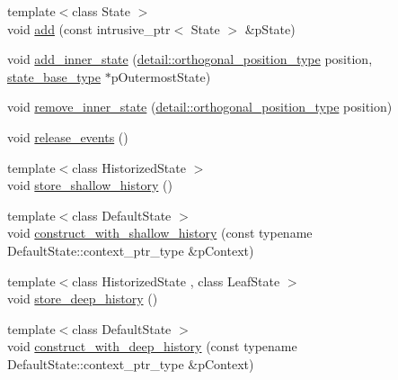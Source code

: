 \begin{DoxyCompactItemize}
\item 
{\footnotesize template$<$class State $>$ }\\void \mbox{\hyperlink{classboost_1_1statechart_1_1state__machine_ae1b47e23bb0486e60f2cc9d80fb76b99}{add}} (const intrusive\+\_\+ptr$<$ State $>$ \&p\+State)
\item 
void \mbox{\hyperlink{classboost_1_1statechart_1_1state__machine_ae3cebe8b5870bda788a95be852e5d3be}{add\+\_\+inner\+\_\+state}} (\mbox{\hyperlink{namespaceboost_1_1statechart_1_1detail_a3bedea0b807a16fa222733417183d2c9}{detail\+::orthogonal\+\_\+position\+\_\+type}} position, \mbox{\hyperlink{classboost_1_1statechart_1_1state__machine_a69cc258c29fcabec25c5dc8bedb7d530}{state\+\_\+base\+\_\+type}} $\ast$p\+Outermost\+State)
\item 
void \mbox{\hyperlink{classboost_1_1statechart_1_1state__machine_a3d848420d633249edb93d984e2bd8bb4}{remove\+\_\+inner\+\_\+state}} (\mbox{\hyperlink{namespaceboost_1_1statechart_1_1detail_a3bedea0b807a16fa222733417183d2c9}{detail\+::orthogonal\+\_\+position\+\_\+type}} position)
\item 
void \mbox{\hyperlink{classboost_1_1statechart_1_1state__machine_ac1526a82bacd6c9e9b3d6bb5001809a9}{release\+\_\+events}} ()
\item 
{\footnotesize template$<$class Historized\+State $>$ }\\void \mbox{\hyperlink{classboost_1_1statechart_1_1state__machine_a3af3b88318ab1711324e1c4b37fa055c}{store\+\_\+shallow\+\_\+history}} ()
\item 
{\footnotesize template$<$class Default\+State $>$ }\\void \mbox{\hyperlink{classboost_1_1statechart_1_1state__machine_ab1ea201332087d93ce5483a413fc1e7f}{construct\+\_\+with\+\_\+shallow\+\_\+history}} (const typename Default\+State\+::context\+\_\+ptr\+\_\+type \&p\+Context)
\item 
{\footnotesize template$<$class Historized\+State , class Leaf\+State $>$ }\\void \mbox{\hyperlink{classboost_1_1statechart_1_1state__machine_a26b501c3b813c446d450aad3981dbfe3}{store\+\_\+deep\+\_\+history}} ()
\item 
{\footnotesize template$<$class Default\+State $>$ }\\void \mbox{\hyperlink{classboost_1_1statechart_1_1state__machine_a56fbbcb60de6f8a423b3b79ddb06ba34}{construct\+\_\+with\+\_\+deep\+\_\+history}} (const typename Default\+State\+::context\+\_\+ptr\+\_\+type \&p\+Context)
\end{DoxyCompactItemize}
